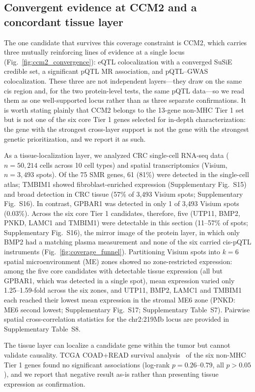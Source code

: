 \documentclass[11pt,a4paper]{article}
\begin{document}
\subsection{Convergent evidence at CCM2 and a concordant tissue layer}

The one candidate that survives this coverage constraint is CCM2, which carries three mutually reinforcing lines of evidence at a single locus (Fig.~\ref{fig:ccm2_convergence}): eQTL
colocalization with a converged SuSiE credible set, a significant pQTL MR
association, and pQTL--GWAS colocalization. These three are not independent layers—they draw on the same cis region and, for the two protein-level tests, the same pQTL data—so we read them as one well-supported locus rather than as three separate confirmations. It is worth stating plainly that CCM2
belongs to the 13-gene non-MHC Tier 1 set but is not one of the six core Tier 1
genes selected for in-depth characterization: the gene with the strongest
cross-layer support is not the gene with the strongest genetic prioritization,
and we report it as such.

As a tissue-localization layer, we analyzed CRC single-cell RNA-seq data
($n = 50,214$ cells across 10 cell types) and spatial transcriptomics (Visium,
$n = 3,493$ spots). Of the 75 SMR genes, 61 (81\%) were detected in the
single-cell atlas; TMBIM1 showed fibroblast-enriched expression
(Supplementary Fig.~S15) and broad detection in CRC tissue (57\% of
3{,}493 Visium spots; Supplementary Fig.~S16). In contrast,
GPBAR1 was detected in only 1 of 3,493 Visium spots (0.03\%). Across the six core
Tier 1 candidates, therefore, five (UTP11, BMP2, PNKD, LAMC1 and TMBIM1) were
detectable in this section (11--57\% of spots; Supplementary Fig.~S16),
the mirror image of the protein layer, in which only BMP2 had a matching plasma
measurement and none of the six carried cis-pQTL instruments (Fig.~\ref{fig:coverage_funnel}). Partitioning
Visium spots into $k=6$ spatial microenvironment (ME) zones showed no zone-restricted expression: among the five core candidates with
detectable tissue expression (all but GPBAR1, which was detected in a single spot),
mean expression varied only 1.25--1.59-fold across the six zones, and UTP11, BMP2,
LAMC1 and TMBIM1 each reached their lowest mean expression in the stromal ME6
zone (PNKD: ME6 second lowest; Supplementary Fig.~S17;
Supplementary Table~S7). Pairwise spatial cross-correlation statistics for the
chr2:219Mb locus are provided in Supplementary Table~S8.

The tissue layer can localize a candidate gene within the tumor but cannot
validate causality. TCGA COAD+READ survival analysis~\cite{weinstein2013tcga} of the six non-MHC Tier 1 genes found no
significant associations (log-rank $p = 0.26$--$0.79$, all $p > 0.05$), and we report that negative result as-is rather than
presenting tissue expression as confirmation.
\end{document}
